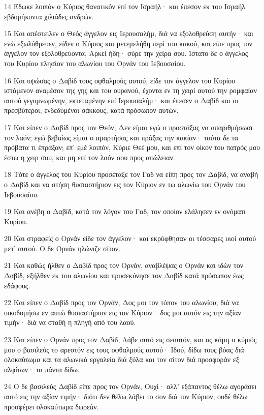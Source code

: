 \par 14 Έδωκε λοιπόν ο Κύριος θανατικόν επί τον Ισραήλ· και έπεσον εκ του Ισραήλ εβδομήκοντα χιλιάδες ανδρών.
\par 15 Και απέστειλεν ο Θεός άγγελον εις Ιερουσαλήμ, διά να εξολοθρεύση αυτήν· και ενώ εξωλόθρευεν, είδεν ο Κύριος και μετεμελήθη περί του κακού, και είπε προς τον άγγελον τον εξολοθρεύοντα, Αρκεί ήδη· σύρε την χείρα σου. Ίστατο δε ο άγγελος του Κυρίου πλησίον του αλωνίου του Ορνάν του Ιεβουσαίου.
\par 16 Και υψώσας ο Δαβίδ τους οφθαλμούς αυτού, είδε τον άγγελον του Κυρίου ιστάμενον αναμέσον της γης και του ουρανού, έχοντα εν τη χειρί αυτού την ρομφαίαν αυτού γεγυμνωμένην, εκτεταμένην επί Ιερουσαλήμ· και έπεσεν ο Δαβίδ και οι πρεσβύτεροι, ενδεδυμένοι σάκκους, κατά πρόσωπον αυτών.
\par 17 Και είπεν ο Δαβίδ προς τον Θεόν, Δεν είμαι εγώ ο προστάξας να απαριθμήσωσι τον λαόν; εγώ βεβαίως είμαι ο αμαρτήσας και πράξας την κακίαν· ταύτα δε τα πρόβατα τι έπραξαν; επ' εμέ λοιπόν, Κύριε Θεέ μου, και επί τον οίκον του πατρός μου έστω η χειρ σου, και μη επί τον λαόν σου προς απώλειαν.
\par 18 Τότε ο άγγελος του Κυρίου προσέταξε τον Γαδ να είπη προς τον Δαβίδ, να αναβή ο Δαβίδ και να στήση θυσιαστήριον εις τον Κύριον εν τω αλωνίω του Ορνάν του Ιεβουσαίου.
\par 19 Και ανέβη ο Δαβίδ, κατά τον λόγον του Γαδ, τον οποίον ελάλησεν εν ονόματι Κυρίου.
\par 20 Και στραφείς ο Ορνάν είδε τον άγγελον· και εκρύφθησαν οι τέσσαρες υιοί αυτού μετ' αυτού. Ο δε Ορνάν ηλώνιζε σίτον.
\par 21 Και καθώς ήλθεν ο Δαβίδ προς τον Ορνάν, αναβλέψας ο Ορνάν και ιδών τον Δαβίδ, εξήλθεν εκ του αλωνίου και προσεκύνησε τον Δαβίδ κατά πρόσωπον έως εδάφους.
\par 22 Και είπεν ο Δαβίδ προς τον Ορνάν, Δος μοι τον τόπον του αλωνίου, διά να οικοδομήσω εν αυτώ θυσιαστήριον εις τον Κύριον· δος μοι αυτόν εις την αξίαν τιμήν· διά να σταθή η πληγή από του λαού.
\par 23 Και είπεν ο Ορνάν προς τον Δαβίδ, Λάβε αυτό εις σεαυτόν, και ας κάμη ο κύριός μου ο βασιλεύς το αρεστόν εις τους οφθαλμούς αυτού· Ιδού, δίδω τους βόας διά ολοκαύτωμα και τα αλωνικά εργαλεία διά ξύλα και τον σίτον διά προσφοράν εξ αλφίτων· τα πάντα δίδω.
\par 24 Ο δε βασιλεύς Δαβίδ είπε προς τον Ορνάν, Ουχί· αλλ' εξάπαντος θέλω αγοράσει αυτό εις την αξίαν τιμήν· διότι δεν θέλω λάβει το σον διά τον Κύριον, ουδέ θέλω προσφέρει ολοκαύτωμα δωρεάν.
